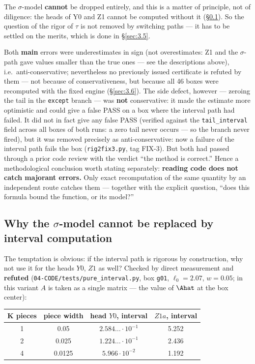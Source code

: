 The $\sigma$-model \textbf{cannot} be dropped entirely, and this is a matter of
principle, not of diligence: the heads of Y0 and Z1 cannot be computed
without it (\S\ref{sec:3.4}). So the question of the rigor of $\tau$ is not removed by
switching paths --- it has to be settled on the merits, which is done in \S\ref{sec:3.5}.

Both \textbf{main} errors were underestimates in sign (not overestimates: Z1 and
the $\sigma$-path gave values smaller than the true ones --- see the descriptions
above), i.e.\ anti-conservative; nevertheless no previously issued
certificate is refuted by them --- not because of conservativeness, but
because all 46 boxes were recomputed with the fixed engine (\S\ref{sec:3.6}). The side
defect, however --- zeroing the tail in the \texttt{except} branch --- was \textbf{not}
conservative: it made the estimate more optimistic and could give a false
PASS on a box where the interval path had failed. It did not in fact give
any false PASS (verified against the \texttt{tail\_\allowbreak interval} field across all boxes
of both runs: a zero tail never occurs --- so the branch never fired), but it
was removed precisely as anti-conservative: now a failure of the interval
path fails the box (\texttt{rig2fix3.py}, tag FIX-3). But both had passed through a
prior code review with the verdict ``the method is correct.'' Hence a
methodological conclusion worth stating separately: \textbf{reading code does not
catch majorant errors.} Only exact recomputation of the same quantity by an
independent route catches them --- together with the explicit question, ``does
this formula bound the function, or its model?''


\subsection{Why the $\sigma$-model cannot be replaced by interval computation}
\label{sec:3.4}

The temptation is obvious: if the interval path is rigorous by construction,
why not use it for the heads $Y0$, $Z1$ as well? Checked by direct
measurement and \textbf{refuted} (\texttt{04-\allowbreak CODE/\allowbreak tests/\allowbreak pure\_\allowbreak interval.py}, box \texttt{g01},
$\ell_0=2.07$, $w=0.05$; in this variant $A$ is taken as a single matrix --- the value
of $\Ahat$ at the box center):

\begin{center}
\begin{tabular}{|c|c|c|c|}
\hline
K pieces & piece width & head $Y0$, interval & $Z1a$, interval \\
\hline
1 & 0.05 & $2.584\ldots \cdot 10^{-1}$ & 5.252 \\
\hline
2 & 0.025 & $1.224\ldots \cdot 10^{-1}$ & 2.436 \\
\hline
4 & 0.0125 & $5.966 \cdot 10^{-2}$ & 1.192 \\
\hline
\end{tabular}
\end{center}

